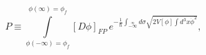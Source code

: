 \begin{equation} P\equiv\int\limits_{\phi (-\infty)=\phi_f}^{\phi (\infty)=\phi_f}
\!\![D\phi]_{FP}\,e^{-\frac{1}{\hbar}\int
_{-\infty}\limits^{\infty}\!\!d\sigma \sqrt{2V[\phi]\int\!
d^3x\dot{\phi}^2 }},\label{pi}\end{equation} 
